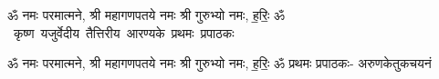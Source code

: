 \documentclass[17pt]{extarticle}
\begin{document}
\begin{titlepage}
    \begin{center}
 
\begin{sanskrit}
    { \Large
    ॐ नमः परमात्मने, श्री महागणपतये नमः
श्री गुरुभ्यो नमः, ह॒रिः॒ ॐ 
    }
    \\
    \vspace{2.5cm}
    \mbox{ \Huge
    कृष्ण यजुर्वेदीय तैत्तिरीय आरण्यके प्रथमः प्रपाठकः   }
\end{sanskrit}
\end{center}

\end{titlepage}
\tableofcontents

ॐ नमः परमात्मने, श्री महागणपतये नमः
श्री गुरुभ्यो नमः, ह॒रिः॒ ॐ      प्रथमः प्रपाठकः- अरुणकेतुकचयनं \newline

\end{document}
